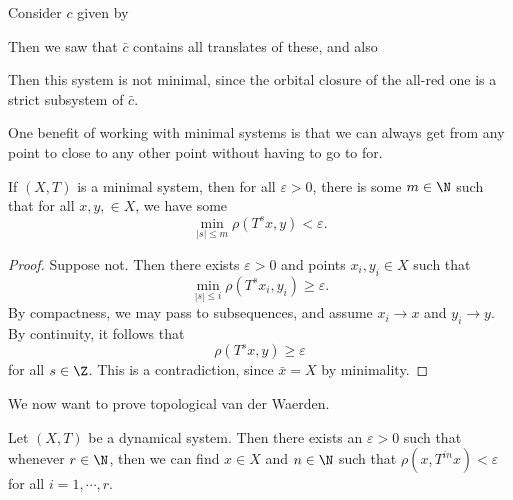 \documentclass[a4paper]{article}
\begin{document}
\begin{eg}
  Consider $c$ given by
  \begin{center}
  \end{center}
  Then we saw that $\bar{c}$ contains all translates of these, and also
  \begin{center}
    \quad
  \end{center}
  Then this system is not minimal, since the orbital closure of the all-red one is a strict subsystem of $\bar{c}$.
\end{eg}

One benefit of working with minimal systems is that we can always get from any point to close to any other point without having to go to for.
\begin{lemma}
  If $(X, T)$ is a minimal system, then for all $\varepsilon > 0$, there is some $m \in \N$ such that for all $x, y, \in X$, we have some
  \[
    \min_{|s| \leq m} \rho(T^s x, y) < \varepsilon.
  \]
\end{lemma}

\begin{proof}
  Suppose not. Then there exists $\varepsilon > 0$ and points $x_i, y_i \in X$ such that
  \[
    \min_{|s| \leq i} \rho(T^s x_i, y_i) \geq \varepsilon.
  \]
  By compactness, we may pass to subsequences, and assume $x_i \to x$ and $y_i \to y$. By continuity, it follows that
  \[
    \rho(T^s x, y) \geq \varepsilon
  \]
  for all $s \in \Z$. This is a contradiction, since $\bar{x} = X$ by minimality.
\end{proof}
We now want to prove topological van der Waerden.
\begin{thm}
  Let $(X, T)$ be a dynamical system. Then there exists an $\varepsilon > 0$ such that whenever $r \in\N$, then we can find $x \in X$ and $n \in \N$ such that $\rho(x, T^{in} x) < \varepsilon$ for all $i = 1, \cdots, r$.
\end{thm}
\end{document}

